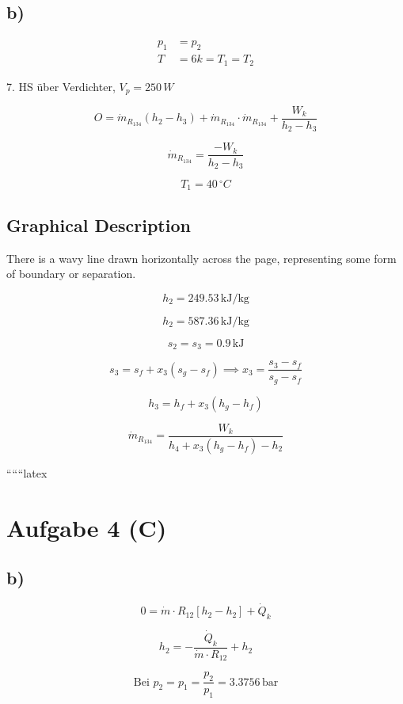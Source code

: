 

\subsection*{b)}

\begin{align*}
    p_1 &= p_2 \\
    T &= 6k = T_1 = T_2
\end{align*}

7. HS über Verdichter, \( V_p = 250 \, W \)

\[
O = \dot{m}_{R_{134}} \left( h_2 - h_3 \right) + \dot{m}_{R_{134}} \cdot \dot{m}_{R_{134}} + \frac{W_k}{h_2 - h_3}
\]

\[
\dot{m}_{R_{134}} = \frac{-W_k}{h_2 - h_3}
\]

\[
T_1 = 40 \, ^\circ C
\]

\subsection*{Graphical Description}

There is a wavy line drawn horizontally across the page, representing some form of boundary or separation.

\[
h_2 = 249.53 \, \text{kJ/kg}
\]

\[
h_2 = 587.36 \, \text{kJ/kg}
\]

\[
s_2 = s_3 = 0.9 \, \text{kJ}
\]

\[
s_3 = s_f + x_3 (s_g - s_f) \implies x_3 = \frac{s_3 - s_f}{s_g - s_f}
\]

\[
h_3 = h_f + x_3 (h_g - h_f)
\]

\[
\dot{m}_{R_{134}} = \frac{W_k}{h_4 + x_3 (h_g - h_f) - h_2}
\]

``````latex


\section*{Aufgabe 4 (C)}



\subsection*{b)}
\[
0 = \dot{m} \cdot R_{12} \left[ h_{2} - h_{2} \right] + \dot{Q}_k
\]

\[
h_2 = -\frac{\dot{Q}_k}{\dot{m} \cdot R_{12}} + h_2
\]

\[
\text{Bei } p_2 = p_1 = \frac{p_2}{p_1} = 3.3756 \, \text{bar}
\]